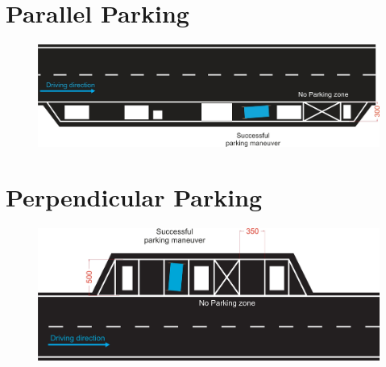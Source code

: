 \begin{figure}[H]
\begin{center}
	\end{center}
\end{figure}

\section{Parallel Parking}
\label{fig_parallel_parking}
\begin{figure}[H]
	\begin{center}
		\centering\includegraphics[]{graphics/Abb_2_parallel_parking.jpg}
	\end{center}
\end{figure}

\section{Perpendicular Parking}
\begin{figure}[H]
	\label{fig_perpendicular_parking}
	\begin{center}
		\centering\includegraphics[]{graphics/Abb_3_perpendicular_parking.jpg}
	\end{center}
\end{figure}

